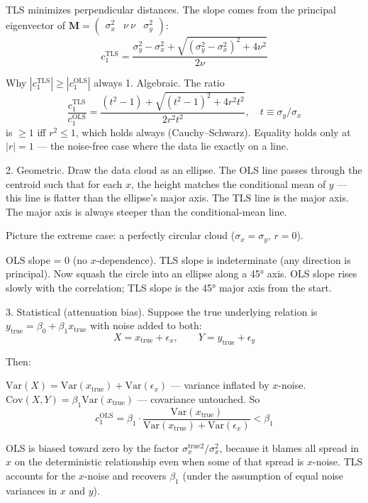 \documentclass[twoside]{article}
\numberwithin{equation}{section}
\begin{document}
TLS minimizes perpendicular distances. The slope comes from the principal eigenvector of $\mathbf{M} = \begin{pmatrix}\sigma_x^2 & \nu \ \nu & \sigma_y^2\end{pmatrix}$:
$$c_1^{\text{TLS}} = \frac{\sigma_y^2 - \sigma_x^2 + \sqrt{(\sigma_y^2 - \sigma_x^2)^2 + 4\nu^2}}{2\nu}$$

Why $|c_1^{\text{TLS}}| \ge |c_1^{\text{OLS}}|$ always
1. Algebraic. The ratio
$$\frac{c_1^{\text{TLS}}}{c_1^{\text{OLS}}} = \frac{(t^2 - 1) + \sqrt{(t^2 - 1)^2 + 4 r^2 t^2}}{2 r^2 t^2}, \quad t \equiv \sigma_y/\sigma_x$$
is $\ge 1$ iff $r^2 \le 1$, which holds always (Cauchy–Schwarz). Equality holds only at $|r| = 1$ — the noise-free case where the data lie exactly on a line.

2. Geometric. Draw the data cloud as an ellipse. The OLS line passes through the centroid such that for each $x$, the height matches the conditional mean of $y$ — this line is flatter than the ellipse's major axis. The TLS line is the major axis. The major axis is always steeper than the conditional-mean line.

Picture the extreme case: a perfectly circular cloud ($\sigma_x = \sigma_y$, $r = 0$).

OLS slope = 0 (no $x$-dependence).
TLS slope is indeterminate (any direction is principal).
Now squash the circle into an ellipse along a 45° axis. OLS slope rises slowly with the correlation; TLS slope is the 45° major axis from the start.

3. Statistical (attenuation bias). Suppose the true underlying relation is $y_{\text{true}} = \beta_0 + \beta_1 x_{\text{true}}$ with noise added to both:
$$X = x_{\text{true}} + \epsilon_x, \qquad Y = y_{\text{true}} + \epsilon_y$$

Then:

$\text{Var}(X) = \text{Var}(x_{\text{true}}) + \text{Var}(\epsilon_x)$ — variance inflated by $x$-noise.
$\text{Cov}(X, Y) = \beta_1 \text{Var}(x_{\text{true}})$ — covariance untouched.
So
$$c_1^{\text{OLS}} = \beta_1 \cdot \frac{\text{Var}(x_{\text{true}})}{\text{Var}(x_{\text{true}}) + \text{Var}(\epsilon_x)} < \beta_1$$

OLS is biased toward zero by the factor $\sigma_x^{\text{true}2}/\sigma_x^2$, because it blames all spread in $x$ on the deterministic relationship even when some of that spread is $x$-noise. TLS accounts for the $x$-noise and recovers $\beta_1$ (under the assumption of equal noise variances in $x$ and $y$).
\end{document}
